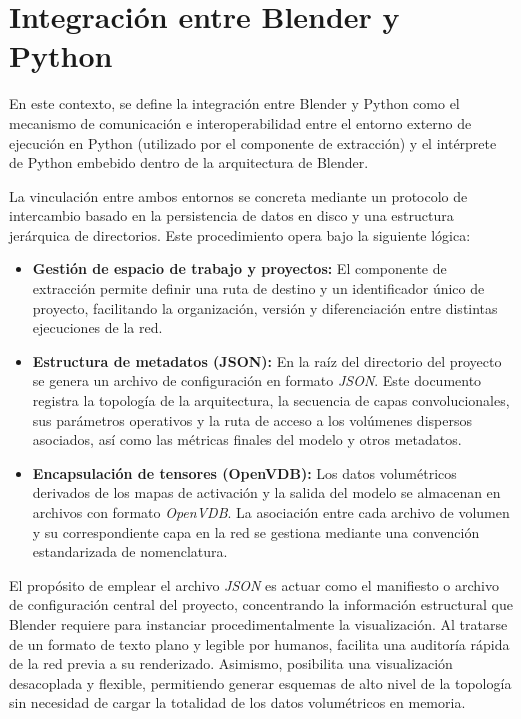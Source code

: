 \section{Integración entre Blender y Python}
En este contexto, se define la integración entre Blender y Python como el mecanismo de comunicación e 
interoperabilidad entre el entorno externo de ejecución en Python (utilizado por el componente de extracción) 
y el intérprete de Python embebido dentro de la arquitectura de Blender.
\medskip

La vinculación entre ambos entornos se concreta mediante un protocolo de intercambio basado en la persistencia 
de datos en disco y una estructura jerárquica de directorios. Este procedimiento opera bajo la siguiente lógica:

\begin{itemize}
    \item \textbf{Gestión de espacio de trabajo y proyectos:} El componente de extracción permite definir una 
    ruta de destino y un identificador único de proyecto, facilitando la organización, versión y diferenciación 
    entre distintas ejecuciones de la red.
    \item \textbf{Estructura de metadatos (JSON):} En la raíz del directorio del proyecto se genera un archivo de 
    configuración en formato \textit{JSON}. Este documento registra la topología de la arquitectura, la 
    secuencia de capas convolucionales, sus parámetros operativos y la ruta de acceso a los volúmenes 
    dispersos asociados, así como las métricas finales del modelo y otros metadatos.
    \item \textbf{Encapsulación de tensores (OpenVDB):} Los datos volumétricos derivados de los mapas de 
    activación y la salida del modelo se almacenan en archivos con formato \textit{OpenVDB}. La asociación 
    entre cada archivo de volumen y su correspondiente capa en la red se gestiona mediante una convención 
    estandarizada de nomenclatura.
\end{itemize}

El propósito de emplear el archivo \textit{JSON} es actuar como el manifiesto o archivo de configuración 
central del proyecto, concentrando la información estructural que Blender requiere para instanciar 
procedimentalmente la visualización. Al tratarse de un formato de texto plano y legible por humanos, 
facilita una auditoría rápida de la red previa a su renderizado. Asimismo, posibilita una visualización 
desacoplada y flexible, permitiendo generar esquemas de alto nivel de la topología sin necesidad de cargar 
la totalidad de los datos volumétricos en memoria.
\medskip

